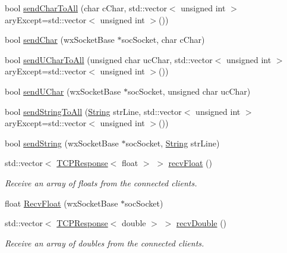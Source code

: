 \begin{DoxyCompactItemize}
bool \hyperlink{class_rad_j_a_v_1_1_networking_1_1wx_widgets_t_c_p_server_aa6f6b6b62002a95f65ed1746a25d3048}{send\+Char\+To\+All} (char c\+Char, std\+::vector$<$ unsigned int $>$ ary\+Except=std\+::vector$<$ unsigned int $>$())
\item 
bool \hyperlink{class_rad_j_a_v_1_1_networking_1_1wx_widgets_t_c_p_server_ae40280956d8bba29f636b6104c08b719}{send\+Char} (wx\+Socket\+Base $\ast$soc\+Socket, char c\+Char)
\item 
bool \hyperlink{class_rad_j_a_v_1_1_networking_1_1wx_widgets_t_c_p_server_a74a6dd1c944b3781e2ed286f14d79813}{send\+U\+Char\+To\+All} (unsigned char uc\+Char, std\+::vector$<$ unsigned int $>$ ary\+Except=std\+::vector$<$ unsigned int $>$())
\item 
bool \hyperlink{class_rad_j_a_v_1_1_networking_1_1wx_widgets_t_c_p_server_adf18ccc8867bb45e801a0ad699e14cbe}{send\+U\+Char} (wx\+Socket\+Base $\ast$soc\+Socket, unsigned char uc\+Char)
\item 
bool \hyperlink{class_rad_j_a_v_1_1_networking_1_1wx_widgets_t_c_p_server_ab94fd4375ec2d5a37951b9004bd8cdae}{send\+String\+To\+All} (\hyperlink{class_rad_j_a_v_1_1_string}{String} str\+Line, std\+::vector$<$ unsigned int $>$ ary\+Except=std\+::vector$<$ unsigned int $>$())
\item 
bool \hyperlink{class_rad_j_a_v_1_1_networking_1_1wx_widgets_t_c_p_server_a60916dc2a924530fe488de6d7d38659b}{send\+String} (wx\+Socket\+Base $\ast$soc\+Socket, \hyperlink{class_rad_j_a_v_1_1_string}{String} str\+Line)
\item 
std\+::vector$<$ \hyperlink{class_rad_j_a_v_1_1_networking_1_1_t_c_p_response}{T\+C\+P\+Response}$<$ float $>$ $>$ \hyperlink{class_rad_j_a_v_1_1_networking_1_1wx_widgets_t_c_p_server_a25f1060df172b7ac485c062d5598ee04}{recv\+Float} ()
\begin{DoxyCompactList}\small\item\em Receive an array of floats from the connected clients. \end{DoxyCompactList}\item 
float \hyperlink{class_rad_j_a_v_1_1_networking_1_1wx_widgets_t_c_p_server_a9296263dca17a376711a36753965dd51}{Recv\+Float} (wx\+Socket\+Base $\ast$soc\+Socket)
\item 
std\+::vector$<$ \hyperlink{class_rad_j_a_v_1_1_networking_1_1_t_c_p_response}{T\+C\+P\+Response}$<$ double $>$ $>$ \hyperlink{class_rad_j_a_v_1_1_networking_1_1wx_widgets_t_c_p_server_a1c445d2b459e6a249ec132da08f230bd}{recv\+Double} ()
\begin{DoxyCompactList}\small\item\em Receive an array of doubles from the connected clients. \end{DoxyCompactList}\item 

\end{DoxyCompactItemize}
